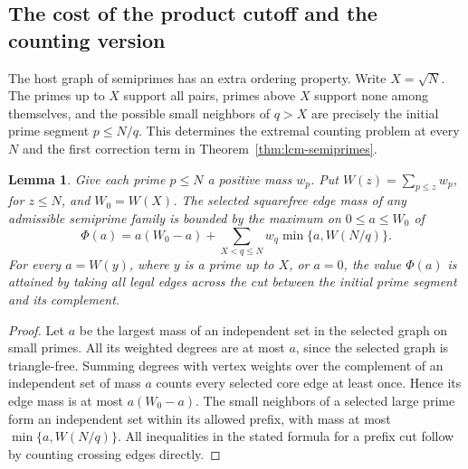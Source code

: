 \documentclass[11pt,a4paper]{article}
\newtheorem{lemma}[theorem]{Lemma}
\begin{document}
\subsection{The cost of the product cutoff and the counting version}
The host graph of semiprimes has an extra ordering property. Write
$X=\sqrt N$. The primes up to $X$ support all pairs, primes above $X$
support none among themselves, and the possible small neighbors of $q>X$
are precisely the initial prime segment $p\le N/q$. This determines the
extremal counting problem at every $N$ and the first correction term in
Theorem~\ref{thm:lcm-semiprimes}.

\begin{lemma}\label{lem:lcm-prefix}
Give each prime $p\le N$ a positive mass $w_p$. Put
$W(z)=\sum_{p\le z}w_p$, for $z\le N$, and $W_0=W(X)$.
The selected squarefree edge mass of any admissible semiprime family
is bounded by the maximum on $0\le a\le W_0$ of
\[
 \Phi(a)=a(W_0-a)+\sum_{X<q\le N}w_q\min\{a,W(N/q)\}.
\]
For every $a=W(y)$, where $y$ is a prime up to $X$, or $a=0$,
the value $\Phi(a)$ is attained by taking all legal edges across the cut
between the initial prime segment and its complement.
\end{lemma}
\begin{proof}
Let $a$ be the largest mass of an independent set in the selected graph on
small primes. All its weighted degrees are at most $a$, since the selected
graph is triangle-free. Summing degrees with vertex weights over the
complement of an independent set of mass $a$ counts every selected core edge
at least once. Hence its edge mass is at most $a(W_0-a)$. The small
neighbors of a selected large prime form an independent set within its
allowed prefix, with mass at most $\min\{a,W(N/q)\}$. All inequalities in
the stated formula for a prefix cut follow by counting crossing edges
directly.
\end{proof}
\end{document}
